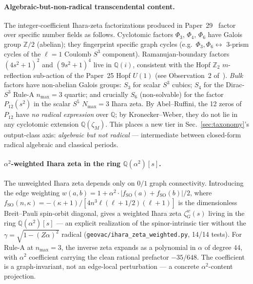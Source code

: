 \documentclass[aps,pra,twocolumn,superscriptaddress,longbibliography]{revtex4-2}
\begin{document}
\paragraph{Algebraic-but-non-radical transcendental content.}
The integer-coefficient Ihara-zeta factorizations produced in
Paper~29~\cite{loutey_paper29} factor over specific number fields as
follows. Cyclotomic factors $\Phi_3$, $\Phi_4$, $\Phi_6$ have Galois
group $\mathbb{Z}/2$ (abelian); they fingerprint specific graph cycles
(e.g.~$\Phi_3, \Phi_6 \leftrightarrow$ 3-prism cycles of the $\ell=1$
Coulomb $S^3$ component). Ramanujan-boundary factors
$(4s^2+1)^2$ and $(9s^2+1)^4$ live in $\mathbb{Q}(i)$, consistent
with the Hopf $\mathbb{Z}_2$ $m$-reflection sub-action of the Paper~25
Hopf $U(1)$ (see Observation~2 of~\cite{loutey_paper29}).
\emph{Bulk} factors have non-abelian Galois groups: $S_3$ for scalar
$S^3$ cubics; $S_4$ for the Dirac-$S^3$ Rule-A $n_{\max}=3$ quartic;
and crucially $S_6$ (non-solvable) for the factor $P_{12}(s^2)$ in
the scalar $S^5$ $N_{\max}=3$ Ihara zeta. By Abel--Ruffini, the 12
zeros of $P_{12}$ have \emph{no radical expression} over
$\mathbb{Q}$; by Kronecker--Weber, they do not lie in any cyclotomic
extension $\mathbb{Q}(\zeta_M)$. This places a new tier in
Sec.~\ref{sec:taxonomy}'s output-class axis: \emph{algebraic but
not radical} --- intermediate between closed-form radical algebraic
and classical periods.

\paragraph{$\alpha^2$-weighted Ihara zeta in the ring
$\mathbb{Q}(\alpha^2)[s]$.}  The unweighted Ihara zeta
depends only on $0/1$ graph connectivity. Introducing the edge
weighting $w(a, b) = 1 + \alpha^2 \cdot |f_{\mathrm{SO}}(a) +
f_{\mathrm{SO}}(b)|/2$, where
$f_{\mathrm{SO}}(n, \kappa) = -(\kappa+1)/[4 n^3 \ell(\ell+1/2)(\ell+1)]$
is the dimensionless Breit--Pauli spin-orbit diagonal, gives a
weighted Ihara zeta $\zeta_G^w(s)$ living in the ring
$\mathbb{Q}(\alpha^2)[s]$ --- an explicit realization of the
spinor-intrinsic tier without the $\gamma = \sqrt{1 - (Z\alpha)^2}$
radical (\texttt{geovac/ihara\_zeta\_weighted.py}, 14/14 tests).
For Rule-A at $n_{\max}=3$, the inverse zeta expands as a polynomial
in $\alpha$ of degree 44, with $\alpha^2$ coefficient carrying
the clean rational prefactor $-35/648$. The coefficient is a
graph-invariant, not an edge-local perturbation --- a concrete
$\alpha^2$-content projection.
\end{document}
